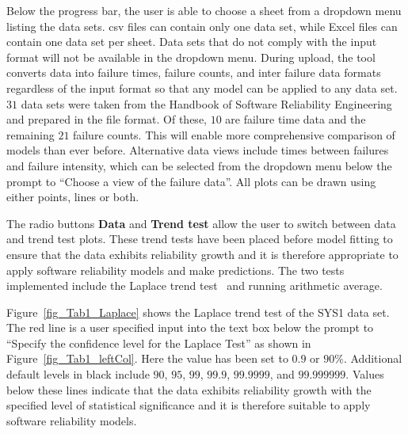 \documentclass[journal]{IEEEtran}
\begin{document}
Below the progress bar, the user is able to choose a sheet from a dropdown menu listing the data sets. csv files can contain only one data set, while Excel files can contain one data set per sheet. Data sets that do not comply with the input format will not be available in the dropdown menu. During upload, the tool converts data into failure times, failure counts, and inter failure data formats regardless of the input format so that any model can be applied to any data set. $31$ data sets were taken from the Handbook of Software Reliability Engineering~\cite{BookHoSRE} and prepared in the file format. Of these, $10$ are failure time data and the remaining $21$ failure counts. This will enable more comprehensive comparison of models than ever before. Alternative data views include times between failures and failure intensity, which can be selected from the dropdown menu below the prompt to ``Choose a view of the failure data''. All plots can be drawn using either points, lines or both.


The radio buttons \textbf{Data} and \textbf{Trend test} allow the user to switch between data and trend test plots. These trend tests have been placed before model fitting to ensure that the data exhibits reliability growth and it is therefore appropriate to apply software reliability models and make predictions. The two tests implemented include the Laplace trend test~\cite{gaudoin1992optimal} and running arithmetic average.

Figure~\ref{fig_Tab1_Laplace} shows the Laplace trend test of the SYS1 data set. The red line is a user specified input into the text box below the prompt to ``Specify the confidence level for the Laplace Test'' as shown in Figure~\ref{fig_Tab1_leftCol}. Here the value has been set to $0.9$ or $90\%$. Additional default levels in black include $90$, $95$, $99$, $99.9$, $99.9999$, and $99.999999$. Values below these lines indicate that the data exhibits reliability growth with the specified level of statistical significance and it is therefore suitable to apply software reliability models.
\end{document}
